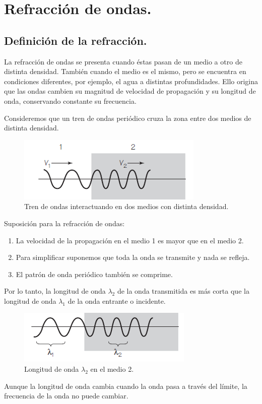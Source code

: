 \documentclass[12pt, letter]{article}
\begin{document}
\section{Refracción de ondas.}

\subsection{Definición de la refracción.}

La refracción de ondas se presenta cuando éstas pasan de un medio a otro de distinta densidad. También cuando el medio es el mismo, pero se encuentra en condiciones diferentes, por ejemplo, el agua a distintas profundidades. Ello origina que las ondas cambien su magnitud de velocidad de propagación y su longitud de onda, conservando constante su frecuencia.

Consideremos que un tren de ondas periódico cruza la zona entre dos medios de distinta densidad.
\begin{figure}[H]
    \centering
    \includegraphics[scale=1]{Imagenes/Refraccion_Ondas_02.png}
    \caption{Tren de ondas interactuando en dos medios con distinta densidad.}
\end{figure}

Suposición para la refracción de ondas:
\begin{enumerate}
\item La velocidad de la propagación en el medio 1 es mayor que en el medio 2.
\item Para simplificar suponemos que toda la onda se transmite y nada se refleja.
\item El patrón de onda periódico también se comprime.
\end{enumerate}
Por lo tanto, la longitud de onda $\lambda_{2}$ de la onda transmitida es más corta que la longitud de onda $\lambda_{1}$ de la onda entrante o incidente.
\begin{figure}[H]
    \centering
    \includegraphics[scale=1]{Imagenes/Refraccion_Ondas_03.png}
    \caption{Longitud de onda $\lambda_{2}$ en el medio 2.}
\end{figure}
Aunque la longitud de onda cambia cuando la onda pasa a través del límite, la frecuencia de la onda no puede cambiar.
\end{document}
